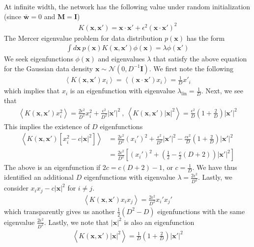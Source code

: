 \documentclass{article} %
\def\w{\bm w}
\def\x{\bm x}
\begin{document}
At infinite width, the network has the following value under random initialization (since $\bar{\w} = 0$ and $\bm M = \bm I$) 
\begin{align}
    K(\x,\x') = \x \cdot \x' + \epsilon^2 (\x \cdot \x')^2
\end{align}
The Mercer eigenvalue problem for data distribution $p(\x)$ has the form
\begin{align}
    \int d\x \ p(\x) K(\x,\x') \phi(\x) = \lambda \phi(\x')
\end{align}
We seek eigenfunctions $\phi(\x)$ and eigenvalues $\lambda$ that satisfy the above equation for the Gaussian data density $\x \sim \mathcal{N}(0,D^{-1} \bm I)$. We first note the following
\begin{align}
    \left< K(\x,\x') x_i \right> = \left< (\x \cdot \x') x_i \right> = \frac{1}{D} x'_i
\end{align}
which implies that $x_i$ is an eigenfunction with eigenvalue $\lambda_{\text{lin}} = \frac{1}{D}$. Next, we see that
\begin{align}
    \left< K(\x,\x') x_i^2 \right> = \frac{2 \epsilon^2 }{D^2} x_i^2 + \frac{\epsilon^2}{D^2} |\x'|^2 \ , \  \left< K(\x,\x') |\x|^2 \right> = \frac{\epsilon^2}{D} \left( 1 + \frac{2}{D} \right) |\x'|^2
\end{align}
This implies the existence of $D$ eigenfunctions
\begin{align}
    \left< K(\x,\x') [x_i^2 - c |\x|^2] \right> &= \frac{2 \epsilon^2 }{D^2} (x_i')^2 + \frac{\epsilon^2}{D^2} |\x'|^2 - \frac{ c \epsilon^2 }{D} \left(1 + \frac{2}{D} \right)|\x'|^2 \nonumber
    \\
    &= \frac{2\epsilon^2}{D^2} \left[ (x_i')^2 +  \left( \frac{1}{2} - \frac{c}{2}\left( D + 2 \right) \right) |\x'|^2 \right]
\end{align}
The above is an eigenfunction if $2 c = c (D + 2) - 1$, or $c = \frac{1}{D}$. We have thus identified an additional $D$ eigenfunctions with eigenvalue $\lambda = \frac{2 \epsilon^2}{D^2}$. Lastly, we consider $x_i x_j - c |\x|^2$ for $i \neq j$.
\begin{align}
        \left< K(\x,\x') x_i x_j \right> = \frac{2 \epsilon^2}{D^2} x_i' x_j'
\end{align}
which transparently gives us another $\frac{1}{2} ( D^2 - D)$ eigenfunctions with the same eigenvalue $\frac{2\epsilon^2}{D^2}$.  Lastly, we note that $|\x|^2$ is also an eigenfunction
\begin{align}
    \left< K(\x,\x') |\x|^2 \right> = \frac{1}{D} \left(1 + \frac{2}{D} \right) |\x'|^2
\end{align}
\end{document}
